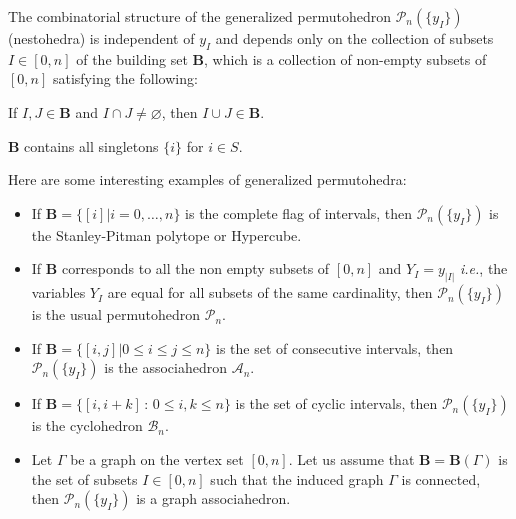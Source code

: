 \documentclass[hidelinks,12pt]{article}
\begin{document}
The combinatorial structure of the generalized permutohedron ${\mathscr P_n(\{y_I\})}$ (nestohedra) is independent of $y_I$ and depends only on the collection of subsets $I \in [0,n]$ of the  building set ${\mathbf B}$, which is 
a collection of non-empty subsets of $[0,n]$ satisfying the following: %
\begin{compactenum}[\quad (1)]
    \item If $I,J \in {\mathbf B}$ and $I \cap J \neq \varnothing $, then $I \cup J \in {\mathbf B}$.
    \item ${\mathbf B}$ contains all singletons $\{ i\}$ for $i \in S$.
\end{compactenum}
Here are some interesting examples of generalized permutohedra:
\begin{itemize}
    \item  If ${\mathbf B}= \{[i] | i=0,\dots,n \}$ is the complete flag of intervals, then ${\mathscr P_n(\{y_I\})}$ is the Stanley-Pitman polytope or Hypercube.
    \item If ${\mathbf B}$ corresponds to all the non empty subsets of $[0,n]$ and $Y_I =y_{|I|}$ {\it i.e.}, the variables $Y_I$ are equal for all subsets of the same cardinality, then ${\mathscr P_n(\{y_I\})}$ is the usual permutohedron ${\mathscr P_n}$. 
    \item If ${\mathbf B}=\{ [i,j] | 0\leq  i \leq j \leq n\}$ is the set of consecutive intervals, then ${\mathscr P_n(\{y_I\})}$ is the associahedron ${\mathscr A_n}$. 
    \item If  $\mathbf B=\{[i,i+k]\,:\,0\leq i, k\leq n\}$ is the set of cyclic intervals, then ${\mathscr P_n(\{y_I\})}$ is the cyclohedron ${\mathscr B_n}$.
    \item Let $\Gamma$ be a graph on the vertex set $[0,n]$. Let us assume that ${\mathbf B} = {\mathbf B}(\Gamma)$ is the set of subsets $I \in [0,n]$ such that the induced graph $\Gamma$ is connected, then  ${\mathscr P_n(\{y_I\})}$ is a graph associahedron.
\end{itemize}
\end{document}
